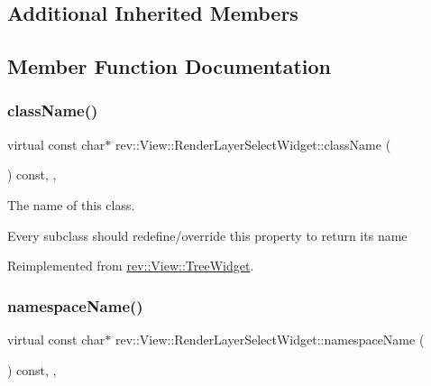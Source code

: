 \subsection*{Additional Inherited Members}


\subsection{Member Function Documentation}
\mbox{\label{classrev_1_1_view_1_1_render_layer_select_widget_af00c2a10bb0fafd2814b11a7abed74fc}} 
\subsubsection{\texorpdfstring{className()}{className()}}
{\footnotesize\ttfamily virtual const char$\ast$ rev\+::\+View\+::\+Render\+Layer\+Select\+Widget\+::class\+Name (\begin{DoxyParamCaption}{ }\end{DoxyParamCaption}) const\hspace{0.3cm}{\ttfamily [inline]}, {\ttfamily [override]}, {\ttfamily [virtual]}}



The name of this class. 

Every subclass should redefine/override this property to return its name 

Reimplemented from \mbox{\hyperlink{classrev_1_1_view_1_1_tree_widget_aedde04f44badced7c60f0e1570e3d0b2}{rev\+::\+View\+::\+Tree\+Widget}}.

\mbox{\label{classrev_1_1_view_1_1_render_layer_select_widget_a3f7f6f78fbfdc91168b7d1c762ecb0af}} 
\subsubsection{\texorpdfstring{namespaceName()}{namespaceName()}}
{\footnotesize\ttfamily virtual const char$\ast$ rev\+::\+View\+::\+Render\+Layer\+Select\+Widget\+::namespace\+Name (\begin{DoxyParamCaption}{ }\end{DoxyParamCaption}) const\hspace{0.3cm}{\ttfamily [inline]}, {\ttfamily [override]}, {\ttfamily [virtual]}}



